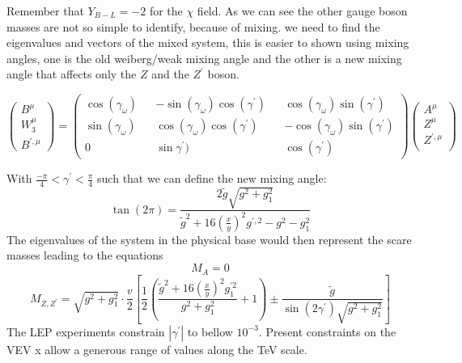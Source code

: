 \documentclass[11pt,twoside,a4paper]{article}
\begin{document}
Remember that $Y_{B-L}=-2$ for the $\chi$ field. As we can see the other gauge boson masses are not so simple to identify, because of mixing. we need to find the eigenvalues and vectors of the mixed system, this is easier to shown using mixing angles, one is the old weiberg/weak mixing angle and the other is a new mixing angle that affects only the $Z$ and the $Z^\prime$ boson. 

\begin{equation}
\begin{pmatrix}
B^\mu \\
W_3^\mu \\
B^{\prime, \mu}
\end{pmatrix}=\begin{pmatrix}
\cos(\gamma_\omega) && -\sin(\gamma_\omega) \cos(\gamma^\prime) && \cos(\gamma_\omega) \sin(\gamma^\prime) \\ 
\sin(\gamma_\omega) && \cos(\gamma_\omega) \cos(\gamma^\prime) && -\cos(\gamma_\omega) \sin(\gamma^\prime) \\ 
0 && \sin\gamma^\prime) && \cos(\gamma^\prime)
\end{pmatrix} \begin{pmatrix}
 A^\mu \\ 
 Z^\mu \\
 Z^{\prime,\mu} \\
\end{pmatrix}
\end{equation}

With $\frac{-\pi}{4} < \gamma^\prime < \frac{\pi}{4}$ such that we can define the new mixing angle: 
\begin{equation}
\tan(2\pi) = \frac{2 \tilde{g} \sqrt{g^2 + g^2_1}}{\tilde{g}^2 + 16 (\frac{x}{y})^2 g^{\prime,2}- g^2 - g^2_1}
\end{equation}
The eigenvalues of the system in the physical base would then represent the scare masses leading to the equations 
\begin{equation}
M_A=0 
\end{equation}
\begin{equation}
M_{Z,Z^\prime}=\sqrt{g^2 + g^2_1} \cdot \frac{v}{2} \left[ \frac{1}{2} \left( \frac{\tilde{g}^2 + 16 (\frac{x}{y})^2 g^{' 2}_1}{g^2 + g^2_1} +1  \right) \pm \frac{\tilde{g}}{\sin(2 \gamma^\prime) \sqrt{g^2 + g^2_1}} \right]
\end{equation}
The LEP experiments constrain $| \gamma^\prime |$ to bellow $10^{-3}$. Present constraints on the VEV x allow a generous range of values along the TeV scale. 
\end{document}
